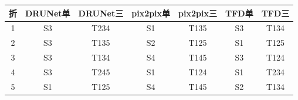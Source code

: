 \begin{tabular}{@{}ccccccc@{}}
\toprule
折 & DRUNet单 & DRUNet三 & pix2pix单 & pix2pix三 & TFD单 & TFD三\\
\midrule
1 & S3 & T234 & S1 & T135 & S3 & T134\\
2 & S3 & T135 & S2 & T125 & S1 & T125\\
3 & S3 & T134 & S4 & T145 & S3 & T124\\
4 & S3 & T245 & S1 & T124 & S1 & T234\\
5 & S1 & T125 & S4 & T145 & S2 & T134\\
\bottomrule
\end{tabular}
